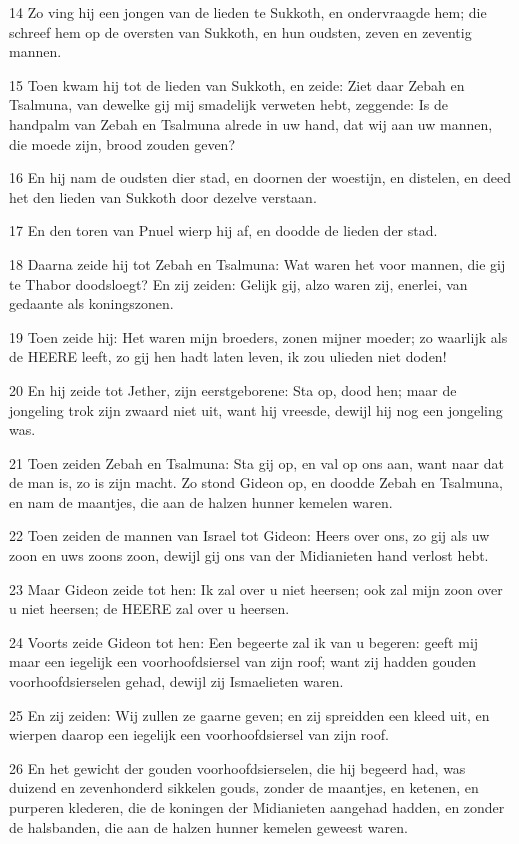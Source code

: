 \par 14 Zo ving hij een jongen van de lieden te Sukkoth, en ondervraagde hem; die schreef hem op de oversten van Sukkoth, en hun oudsten, zeven en zeventig mannen.
\par 15 Toen kwam hij tot de lieden van Sukkoth, en zeide: Ziet daar Zebah en Tsalmuna, van dewelke gij mij smadelijk verweten hebt, zeggende: Is de handpalm van Zebah en Tsalmuna alrede in uw hand, dat wij aan uw mannen, die moede zijn, brood zouden geven?
\par 16 En hij nam de oudsten dier stad, en doornen der woestijn, en distelen, en deed het den lieden van Sukkoth door dezelve verstaan.
\par 17 En den toren van Pnuel wierp hij af, en doodde de lieden der stad.
\par 18 Daarna zeide hij tot Zebah en Tsalmuna: Wat waren het voor mannen, die gij te Thabor doodsloegt? En zij zeiden: Gelijk gij, alzo waren zij, enerlei, van gedaante als koningszonen.
\par 19 Toen zeide hij: Het waren mijn broeders, zonen mijner moeder; zo waarlijk als de HEERE leeft, zo gij hen hadt laten leven, ik zou ulieden niet doden!
\par 20 En hij zeide tot Jether, zijn eerstgeborene: Sta op, dood hen; maar de jongeling trok zijn zwaard niet uit, want hij vreesde, dewijl hij nog een jongeling was.
\par 21 Toen zeiden Zebah en Tsalmuna: Sta gij op, en val op ons aan, want naar dat de man is, zo is zijn macht. Zo stond Gideon op, en doodde Zebah en Tsalmuna, en nam de maantjes, die aan de halzen hunner kemelen waren.
\par 22 Toen zeiden de mannen van Israel tot Gideon: Heers over ons, zo gij als uw zoon en uws zoons zoon, dewijl gij ons van der Midianieten hand verlost hebt.
\par 23 Maar Gideon zeide tot hen: Ik zal over u niet heersen; ook zal mijn zoon over u niet heersen; de HEERE zal over u heersen.
\par 24 Voorts zeide Gideon tot hen: Een begeerte zal ik van u begeren: geeft mij maar een iegelijk een voorhoofdsiersel van zijn roof; want zij hadden gouden voorhoofdsierselen gehad, dewijl zij Ismaelieten waren.
\par 25 En zij zeiden: Wij zullen ze gaarne geven; en zij spreidden een kleed uit, en wierpen daarop een iegelijk een voorhoofdsiersel van zijn roof.
\par 26 En het gewicht der gouden voorhoofdsierselen, die hij begeerd had, was duizend en zevenhonderd sikkelen gouds, zonder de maantjes, en ketenen, en purperen klederen, die de koningen der Midianieten aangehad hadden, en zonder de halsbanden, die aan de halzen hunner kemelen geweest waren.
